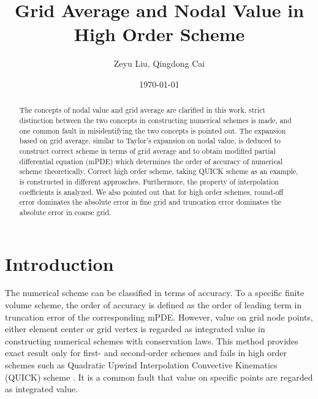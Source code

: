 \documentclass[]{article}
\title{Grid Average and Nodal Value in High Order Scheme}
\author{Zeyu Liu, Qingdong Cai}
\date{\today}
\begin{document}
\maketitle
\begin{abstract}
The concepts of nodal value and grid average are clarified in this work,
strict distinction between the two concepts in constructing
numerical schemes is made,  and one common fault in
misidentifying the two concepts is pointed out. 
The expansion based on grid average,
similar to Taylor's expansion on nodal value, is deduced to construct
correct scheme in terms of grid average and to obtain modified
partial differential equation (mPDE)
which determines the order of accuracy of numerical scheme theoretically.
Correct high order scheme, taking QUICK scheme as an example, is constructed in different
approaches. Furthermore, the property of interpolation coefficients is analyzed.
We also pointed out that for high order schemes, round-off error
dominates the absolute error in fine grid and truncation
error dominates the absolute error in coarse grid.
\end{abstract}
\tableofcontents

\section{Introduction}\label{sec:intro}
The numerical scheme can be classified in terms of accuracy. To a 
specific finite volume scheme, the order of accuracy is defined as the order of leading term
in truncation error of the corresponding mPDE.
However, value on grid node points, either element center or grid vertex is
regarded as integrated value in constructing numerical schemes with
conservation laws.
This method provides exact result only for first- and second-order 
schemes and fails in high order schemes such as Quadratic Upwind Interpolation
Convective Kinematics (QUICK) scheme \cite{leonard1979stable}.
It is a common fault that value on specific points are regarded as
integrated value.
\end{document}
